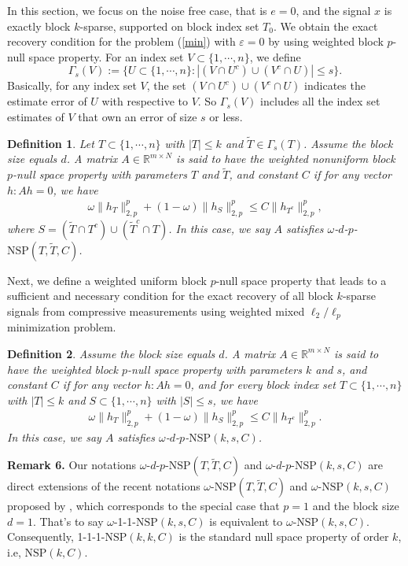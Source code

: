 \documentclass[11pt]{article}
\newtheorem{definition}{Definition}
\begin{document}
In this section, we focus on the noise free case, that is $e=0$, and the signal $x$ is exactly block $k$-sparse, supported on block index set $T_0$. We obtain the exact recovery condition for the problem (\ref{min}) with $\varepsilon=0$ by using weighted block $p$-null space property. For an index set $V\subset\{1,\cdots,n\}$, we define $$
\Gamma_s(V):=\{U\subset\{1,\cdots,n\}: |(V\cap U^c)\cup (V^c\cap U)|\leq s\}.
$$
Basically, for any index set $V$, the set $(V\cap U^c)\cup (V^c\cap U)$ indicates the estimate error of $U$ with respective to $V$. So $\Gamma_s(V)$ includes all the index set estimates of $V$ that own an error of size $s$ or less. 
\begin{definition} Let $T\subset\{1,\cdots,n\}$ with $|T|\leq k$ and $\tilde{T}\in \Gamma_s(T)$. Assume the block size equals $d$. A matrix $A\in\mathbb{R}^{m\times N}$ is said to have the weighted nonuniform block $p$-null space property with parameters $T$ and $\tilde{T}$, and constant $C$ if for any vector $h: Ah=0$, we have \begin{align}
\omega\lVert h_T\rVert_{2,p}^p+(1-\omega)\lVert h_S\rVert_{2,p}^p\leq C\lVert h_{T^c}\rVert_{2,p}^p,
\end{align}
where $S=(\tilde{T}\cap T^c)\cup(\tilde{T}^c\cap T)$. In this case, we say $A$ satisfies $\omega$-$d$-$p$-$\mathrm{NSP}(T,\tilde{T},C)$.
\end{definition}

Next, we define a weighted uniform block $p$-null space property that leads to a sufficient and necessary condition for the exact recovery of all block $k$-sparse signals from compressive measurements using weighted mixed $\ell_2/\ell_p$ minimization problem.\\

\begin{definition} Assume the block size equals $d$. A matrix $A\in\mathbb{R}^{m\times N}$ is said to have the weighted block $p$-null space property with parameters $k$ and $s$, and constant $C$ if for any vector $h: Ah=0$, and for every block index set $T\subset\{1,\cdots,n\}$ with $|T|\leq k$ and $S\subset\{1,\cdots,n\}$ with $|S|\leq s$, we have \begin{align}
\omega\lVert h_T\rVert_{2,p}^p+(1-\omega)\lVert h_S\rVert_{2,p}^p\leq C\lVert h_{T^c}\rVert_{2,p}^p.
\end{align}
In this case, we say $A$ satisfies $\omega$-$d$-$p$-$\mathrm{NSP}(k,s,C)$.
\end{definition}

\noindent
{\bf Remark 6.} Our notations $\omega$-$d$-$p$-$\mathrm{NSP}(T,\tilde{T},C)$ and $\omega$-$d$-$p$-$\mathrm{NSP}(k,s,C)$ are direct extensions of the recent notations $\omega$-$\mathrm{NSP}(T,\tilde{T},C)$ and  $\omega$-$\mathrm{NSP}(k,s,C)$ proposed by \cite{ms}, which corresponds to the special case that $p=1$ and the block size $d=1$. That's to say $\omega$-1-1-$\mathrm{NSP}(k,s,C)$ is equivalent to $\omega$-$\mathrm{NSP}(k,s,C)$. Consequently, 1-1-1-$\mathrm{NSP}(k,k,C)$ is the standard null space property of order $k$, i.e, $\mathrm{NSP}(k,C)$.\\
\end{document}
